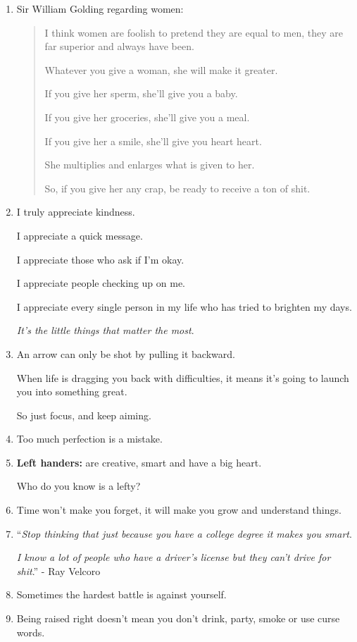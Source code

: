 \documentclass{article}
\numberwithin{equation}{section}
\begin{document}
\begin{enumerate}
    \textit{Small minds discuss people}.'' - Eleanor Roosevelt
    \item Sir William Golding regarding women:
    \begin{quotation}
        I think women are foolish to pretend they are equal to men, they are far superior and always have been.
        
        Whatever you give a woman, she will make it greater.
        
        If you give her sperm, she'll give you a baby.
        
        If you give her groceries, she'll give you a meal.
        
        If you give her a smile, she'll give you heart heart.
        
        She multiplies and enlarges what is given to her.
        
        So, if you give her any crap, be ready to receive a ton of shit.
    \end{quotation}
    \item I truly appreciate kindness.
    
    I appreciate a quick message.
    
    I appreciate those who ask if I'm okay.
    
    I appreciate people checking up on me.
    
    I appreciate every single person in my life who has tried to brighten my days.
    
    \textit{It's the little things that matter the most}.
    \item An arrow can only be shot by pulling it backward.
    
    When life is dragging you back with difficulties, it means it's going to launch you into something great.
    
    So just focus, and keep aiming.
    \item Too much perfection is a mistake.
    \item \textbf{Left handers:} are creative, smart and have a big heart.
    
    Who do you know is a lefty?
    \item Time won't make you forget, it will make you grow and understand things.
    \item ``\textit{Stop thinking that just because you have a college degree it makes you smart}.
    
    \textit{I know a lot of people who have a driver's license but they can't drive for shit}.'' - Ray Velcoro
    \item Sometimes the hardest battle is against yourself.
    \item Being raised right doesn't mean you don't drink, party, smoke or use curse words.
    

\end{enumerate}
\end{document}
